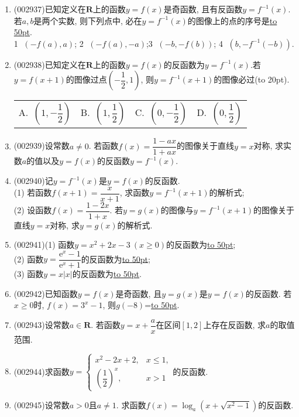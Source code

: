\documentclass[10pt,a4paper]{article}
\newcommand{\blank}[1]{\underline{\hbox to #1pt{}}}
\newcommand{\bracket}[1]{(\hbox to #1pt{})}
\newcommand{\fourch}[4]{\par\begin{tabular}{p{.23\textwidth}p{.23\textwidth}p{.23\textwidth}p{.23\textwidth}}
A.~#1 &B.~#2& C.~#3& D.~#4
\end{tabular}}
\begin{document}
\begin{enumerate}[1.]
\begin{center}
\end{center}
\item {\tiny (002937)}已知定义在$\mathbf{R}$上的函数$y=f(x)$是奇函数, 且有反函数$y=f^{-1}(x)$. 若$a,b$是两个实数, 则下列点中, 必在$y=f^{-1}(x)$的图像上的点的序号是\blank{50}.\\
\textcircled{1} $(-f(a),a)$; \textcircled{2} $(-f(a),-a)$;\textcircled{3} $(-b,-f(b))$; \textcircled{4} $(b,-f^{-1}(-b))$.
\item {\tiny (002938)}已知定义在$\mathbf{R}$上的函数$y=f(x)$的反函数为$y=f^{-1}(x)$.若$y=f(x+1)$的图像过点$(-\dfrac 12,1)$, 则$y=f^{-1}(x+1)$的图像必过\bracket{20}.
\fourch{$(1,-\dfrac 12)$}{$(1,\dfrac 12)$}{$(0,-\dfrac 12)$}{$(0,\dfrac 12)$}
\item {\tiny (002939)}设常数$a\ne 0$. 若函数$f(x)=\dfrac{1-ax}{1+ax}$的图像关于直线$y=x$对称, 求实数$a$的值以及$y=f(x)$的反函数$y=f^{-1}(x)$.
\item {\tiny (002940)}记$y=f^{-1}(x)$是$y=f(x)$的反函数.\\
(1) 若函数$f(x+1)=\dfrac x{x+1}$, 求函数$y=f^{-1}(x+1)$的解析式;\\
(2) 设函数$f(x)=\dfrac{1-2x}{1+x}$. 若$y=g(x)$的图像与$y=f^{-1}(x+1)$的图像关于直线$y=x$对称, 求$y=g(x)$的解析式.
\item {\tiny (002941)}(1) 函数$y=x^2+2x-3\ (x\ge 0)$的反函数为\blank{50};\\
(2) 函数$y=\dfrac{\mathrm{e}^x-1}{{\mathrm{e}}^x+1}$的反函数为\blank{50};\\
(3) 函数$y=x|x|$的反函数为\blank{50}.
\item {\tiny (002942)}已知函数$y=f(x)$是奇函数, 且$y=g(x)$是$y=f(x)$的反函数. 若$x\ge 0$时, $f(x)=3^x-1$, 则$g(-8)$=\blank{50}.
\item {\tiny (002943)}设常数$a\in \mathbf{R}$. 若函数$y=x+\dfrac ax$在区间$[1,2]$上存在反函数, 求$a$的取值范围.
\item {\tiny (002944)}求函数$y=\begin{cases}x^2-2x+2, & x\le 1,\\(\dfrac 12)^x, & x>1  \end{cases}$的反函数.
\item {\tiny (002945)}设常数$a>0$且$a\ne 1$. 求函数$f(x)=\log_a(x+\sqrt{x^2-1})$的反函数.

\end{enumerate}
\end{document}
